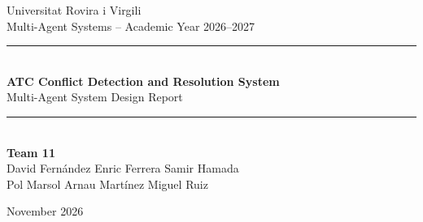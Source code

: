 \documentclass[11pt,a4paper]{article}
\begin{document}
\thispagestyle{empty}
\begingroup
\centering
\vspace*{0.5cm}

{\Large Universitat Rovira i Virgili}\\[0.2cm]
{\large Multi-Agent Systems -- Academic Year 2026--2027}\\[1.2cm]

\rule{\textwidth}{0.8pt}\\[0.4cm]
{\LARGE\bfseries ATC Conflict Detection and Resolution System}\\[0.2cm]
{\large Multi-Agent System Design Report}\\[0.4cm]
\rule{\textwidth}{0.8pt}\\[0.8cm]

{\large\bfseries Team 11}\\[0.2cm]
David Fernández \quad Enric Ferrera \quad Samir Hamada\\
Pol Marsol \quad Arnau Martínez \quad Miguel Ruiz

\vfill

\begin{minipage}{0.9\textwidth}
    \centering
    \tableofcontents
\end{minipage}

\vfill
{\large November 2026}

\clearpage
\endgroup
{}











\clearpage
\nocite{*}


\end{document}
